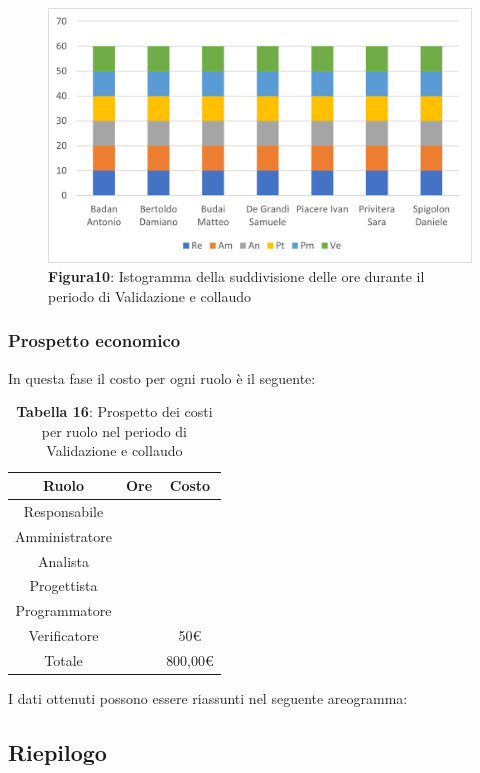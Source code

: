 \begin{figure}[H]
	\centering
	\includegraphics[width=0.7\linewidth]{res/images/Figura10.png}
	\caption*{\textbf{Figura10}: Istogramma della suddivisione delle ore durante il periodo di Validazione e collaudo}
	\label{fig:Figura10}
\end{figure}
	
	
\subsubsection{Prospetto economico}
In questa fase il costo per ogni ruolo è il seguente:

\begin{table}[H]
	\centering
	\renewcommand{\arraystretch}{1.5}
	\begin{tabular}{|c|c|c|}
		\hline
		\rowcolor{lighter-grayer}
		Ruolo & Ore & Costo \\
		\hline
		Responsabile &  &  \\
		\hline
		Amministratore &  &  \\
		\hline
		Analista &  &  \\
		\hline
		Progettista&  &  \\
		\hline
		Programmatore &  &  \\
		\hline
		Verificatore &  & 50\euro \\
		\hline
		Totale &  &  800,00\euro \\
		\hline
	\end{tabular}
\caption*{\textbf{Tabella 16}: Prospetto dei costi per ruolo nel periodo di Validazione e collaudo\\}
\end{table}

I dati ottenuti possono essere riassunti nel seguente areogramma:



\subsection{Riepilogo}